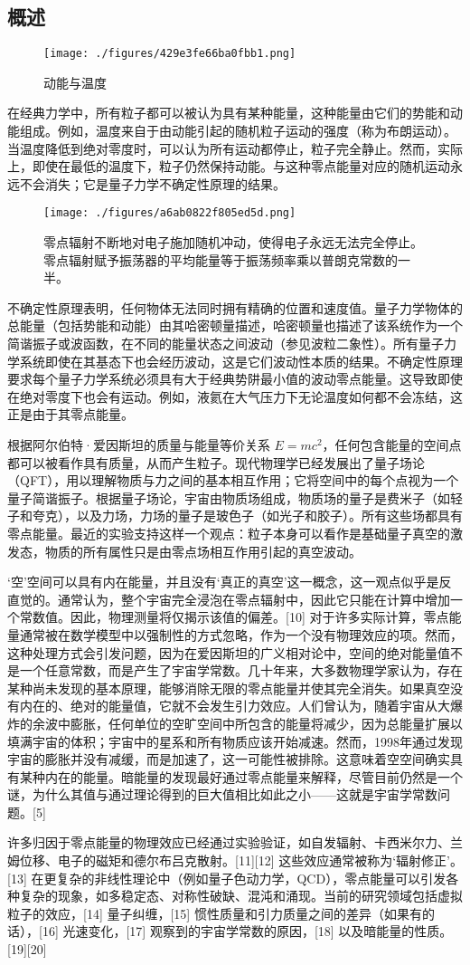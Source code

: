 \subsection{概述}
\begin{figure}[ht]
\centering
\texttt{[image: ./figures/429e3fe66ba0fbb1.png]}
\caption{动能与温度} \label{fig_LD_2}
\end{figure}
在经典力学中，所有粒子都可以被认为具有某种能量，这种能量由它们的势能和动能组成。例如，温度来自于由动能引起的随机粒子运动的强度（称为布朗运动）。当温度降低到绝对零度时，可以认为所有运动都停止，粒子完全静止。然而，实际上，即使在最低的温度下，粒子仍然保持动能。与这种零点能量对应的随机运动永远不会消失；它是量子力学不确定性原理的结果。
\begin{figure}[ht]
\centering
\texttt{[image: ./figures/a6ab0822f805ed5d.png]}
\caption{零点辐射不断地对电子施加随机冲动，使得电子永远无法完全停止。零点辐射赋予振荡器的平均能量等于振荡频率乘以普朗克常数的一半。} \label{fig_LD_3}
\end{figure}
不确定性原理表明，任何物体无法同时拥有精确的位置和速度值。量子力学物体的总能量（包括势能和动能）由其哈密顿量描述，哈密顿量也描述了该系统作为一个简谐振子或波函数，在不同的能量状态之间波动（参见波粒二象性）。所有量子力学系统即使在其基态下也会经历波动，这是它们波动性本质的结果。不确定性原理要求每个量子力学系统必须具有大于经典势阱最小值的波动零点能量。这导致即使在绝对零度下也会有运动。例如，液氦在大气压力下无论温度如何都不会冻结，这正是由于其零点能量。

根据阿尔伯特·爱因斯坦的质量与能量等价关系 \( E = mc^2 \)，任何包含能量的空间点都可以被看作具有质量，从而产生粒子。现代物理学已经发展出了量子场论（QFT），用以理解物质与力之间的基本相互作用；它将空间中的每个点视为一个量子简谐振子。根据量子场论，宇宙由物质场组成，物质场的量子是费米子（如轻子和夸克），以及力场，力场的量子是玻色子（如光子和胶子）。所有这些场都具有零点能量。最近的实验支持这样一个观点：粒子本身可以看作是基础量子真空的激发态，物质的所有属性只是由零点场相互作用引起的真空波动。

‘空’空间可以具有内在能量，并且没有‘真正的真空’这一概念，这一观点似乎是反直觉的。通常认为，整个宇宙完全浸泡在零点辐射中，因此它只能在计算中增加一个常数值。因此，物理测量将仅揭示该值的偏差。[10] 对于许多实际计算，零点能量通常被在数学模型中以强制性的方式忽略，作为一个没有物理效应的项。然而，这种处理方式会引发问题，因为在爱因斯坦的广义相对论中，空间的绝对能量值不是一个任意常数，而是产生了宇宙学常数。几十年来，大多数物理学家认为，存在某种尚未发现的基本原理，能够消除无限的零点能量并使其完全消失。如果真空没有内在的、绝对的能量值，它就不会发生引力效应。人们曾认为，随着宇宙从大爆炸的余波中膨胀，任何单位的空旷空间中所包含的能量将减少，因为总能量扩展以填满宇宙的体积；宇宙中的星系和所有物质应该开始减速。然而，1998年通过发现宇宙的膨胀并没有减缓，而是加速了，这一可能性被排除。这意味着空空间确实具有某种内在的能量。暗能量的发现最好通过零点能量来解释，尽管目前仍然是一个谜，为什么其值与通过理论得到的巨大值相比如此之小——这就是宇宙学常数问题。[5]

许多归因于零点能量的物理效应已经通过实验验证，如自发辐射、卡西米尔力、兰姆位移、电子的磁矩和德尔布吕克散射。[11][12] 这些效应通常被称为‘辐射修正’。[13] 在更复杂的非线性理论中（例如量子色动力学，QCD），零点能量可以引发各种复杂的现象，如多稳定态、对称性破缺、混沌和涌现。当前的研究领域包括虚拟粒子的效应，[14] 量子纠缠，[15] 惯性质量和引力质量之间的差异（如果有的话），[16] 光速变化，[17] 观察到的宇宙学常数的原因，[18] 以及暗能量的性质。[19][20]